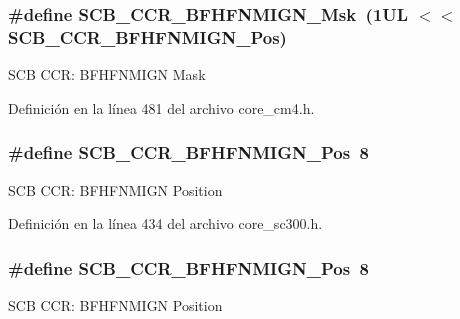 \subsubsection[{\texorpdfstring{S\+C\+B\+\_\+\+C\+C\+R\+\_\+\+B\+F\+H\+F\+N\+M\+I\+G\+N\+\_\+\+Msk}{SCB_CCR_BFHFNMIGN_Msk}}]{\setlength{\rightskip}{0pt plus 5cm}\#define S\+C\+B\+\_\+\+C\+C\+R\+\_\+\+B\+F\+H\+F\+N\+M\+I\+G\+N\+\_\+\+Msk~(1\+U\+L $<$$<$ S\+C\+B\+\_\+\+C\+C\+R\+\_\+\+B\+F\+H\+F\+N\+M\+I\+G\+N\+\_\+\+Pos)}\hypertarget{group___c_m_s_i_s___s_c_b_ga89a28cc31cfc7d52d9d7a8fcc69c7eac}{}\label{group___c_m_s_i_s___s_c_b_ga89a28cc31cfc7d52d9d7a8fcc69c7eac}
S\+CB C\+CR\+: B\+F\+H\+F\+N\+M\+I\+GN Mask 

Definición en la línea 481 del archivo core\+\_\+cm4.\+h.

\subsubsection[{\texorpdfstring{S\+C\+B\+\_\+\+C\+C\+R\+\_\+\+B\+F\+H\+F\+N\+M\+I\+G\+N\+\_\+\+Pos}{SCB_CCR_BFHFNMIGN_Pos}}]{\setlength{\rightskip}{0pt plus 5cm}\#define S\+C\+B\+\_\+\+C\+C\+R\+\_\+\+B\+F\+H\+F\+N\+M\+I\+G\+N\+\_\+\+Pos~8}\hypertarget{group___c_m_s_i_s___s_c_b_ga4010a4f9e2a745af1b58abe1f791ebbf}{}\label{group___c_m_s_i_s___s_c_b_ga4010a4f9e2a745af1b58abe1f791ebbf}
S\+CB C\+CR\+: B\+F\+H\+F\+N\+M\+I\+GN Position 

Definición en la línea 434 del archivo core\+\_\+sc300.\+h.

\subsubsection[{\texorpdfstring{S\+C\+B\+\_\+\+C\+C\+R\+\_\+\+B\+F\+H\+F\+N\+M\+I\+G\+N\+\_\+\+Pos}{SCB_CCR_BFHFNMIGN_Pos}}]{\setlength{\rightskip}{0pt plus 5cm}\#define S\+C\+B\+\_\+\+C\+C\+R\+\_\+\+B\+F\+H\+F\+N\+M\+I\+G\+N\+\_\+\+Pos~8}\hypertarget{group___c_m_s_i_s___s_c_b_ga4010a4f9e2a745af1b58abe1f791ebbf}{}\label{group___c_m_s_i_s___s_c_b_ga4010a4f9e2a745af1b58abe1f791ebbf}
S\+CB C\+CR\+: B\+F\+H\+F\+N\+M\+I\+GN Position 

